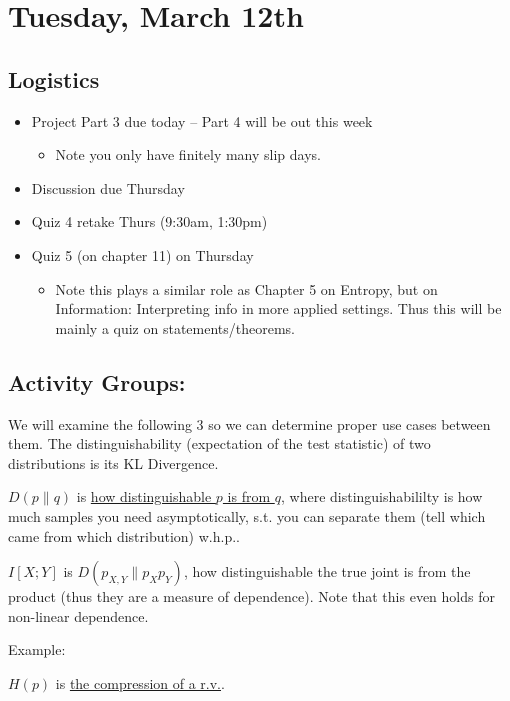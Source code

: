 \section{Tuesday, March 12th}
\subsection{Logistics}
\begin{itemize}
    \item Project Part 3 due today -- Part 4 will be out this week
    \begin{itemize}
        \item Note you only have finitely many slip days.
    \end{itemize}
    \item Discussion due Thursday
    \item Quiz 4 retake Thurs (9:30am, 1:30pm)
    \item Quiz 5 (on chapter 11) on Thursday
    \begin{itemize}
        \item Note this plays a similar role as Chapter 5 on Entropy, but on Information: Interpreting info in more applied settings. Thus this will be mainly a quiz on statements/theorems.
    \end{itemize}
\end{itemize}

\subsection{Activity Groups:}
We will examine the following 3 so we can determine proper use cases between them. The distinguishability (expectation of the test statistic) of two distributions is its KL Divergence.

\begin{shaded}
    $D(p \| q)$ is \underline{how distinguishable $p$ is from $q$}, where distinguishabililty is how much samples you need asymptotically, s.t. you can separate them (tell which came from which distribution) w.h.p.. 
\end{shaded}

\begin{shaded}
    $I[X; Y]$ is \underline{$D(p_{X, Y}\| p_{X} p_{Y})$}, how distinguishable the true joint is from the product (thus they are a measure of dependence). Note that this even holds for non-linear dependence.
\end{shaded}

Example:
\begin{shaded}
    $H(p)$ is \underline{the compression of a r.v.}.
\end{shaded}

